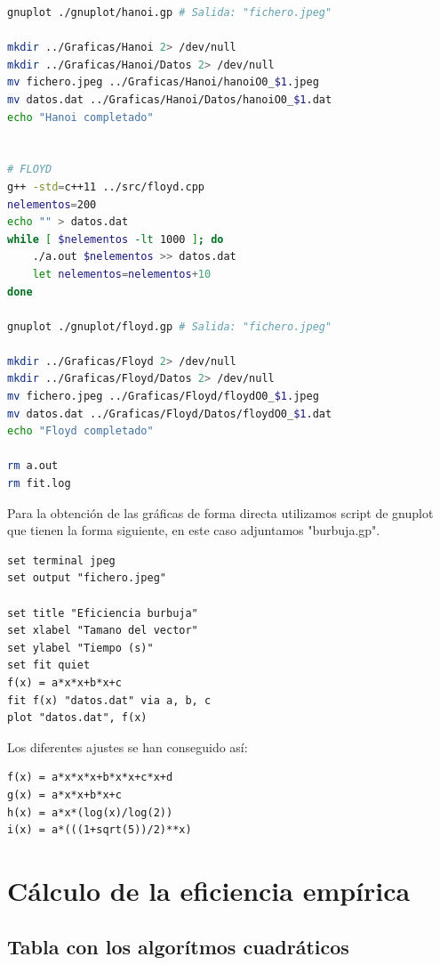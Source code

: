 \documentclass[11pt,spanish]{article} %
\begin{document}
\begin{lstlisting}[language=bash]
gnuplot ./gnuplot/hanoi.gp # Salida: "fichero.jpeg"

mkdir ../Graficas/Hanoi 2> /dev/null
mkdir ../Graficas/Hanoi/Datos 2> /dev/null
mv fichero.jpeg ../Graficas/Hanoi/hanoiO0_$1.jpeg
mv datos.dat ../Graficas/Hanoi/Datos/hanoiO0_$1.dat
echo "Hanoi completado"


# FLOYD
g++ -std=c++11 ../src/floyd.cpp
nelementos=200
echo "" > datos.dat
while [ $nelementos -lt 1000 ]; do
    ./a.out $nelementos >> datos.dat
    let nelementos=nelementos+10
done

gnuplot ./gnuplot/floyd.gp # Salida: "fichero.jpeg"

mkdir ../Graficas/Floyd 2> /dev/null
mkdir ../Graficas/Floyd/Datos 2> /dev/null
mv fichero.jpeg ../Graficas/Floyd/floydO0_$1.jpeg
mv datos.dat ../Graficas/Floyd/Datos/floydO0_$1.dat
echo "Floyd completado"

rm a.out
rm fit.log
\end{lstlisting}

Para la obtención de las gráficas de forma directa utilizamos script de gnuplot que tienen la forma siguiente, en este caso adjuntamos "burbuja.gp".

\begin{lstlisting}[language=gnuplot]
set terminal jpeg
set output "fichero.jpeg"

set title "Eficiencia burbuja"
set xlabel "Tamano del vector"
set ylabel "Tiempo (s)"
set fit quiet
f(x) = a*x*x+b*x+c
fit f(x) "datos.dat" via a, b, c
plot "datos.dat", f(x)
\end{lstlisting}

Los diferentes ajustes se han conseguido así:

\begin{lstlisting}[language=gnuplot]
f(x) = a*x*x*x+b*x*x+c*x+d
g(x) = a*x*x+b*x+c
h(x) = a*x*(log(x)/log(2))
i(x) = a*(((1+sqrt(5))/2)**x)
\end{lstlisting}


\newpage

\section{C\'alculo de la eficiencia emp\'irica}

\subsection{Tabla con los algor\'itmos cuadr\'aticos}
\end{document}
